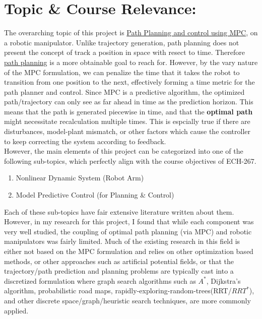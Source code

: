 \documentclass[12px]{article}
\begin{document}
    \pagebreak

    \section*{Topic \& Course Relevance:}


    The overarching topic of this project is \underline{Path Planning and control using MPC}, on a robotic manipulator. Unlike trajectory generation, path planning does not present the concept of track a position in space with resect to time. Therefore \underline{path planning} is a more obtainable goal to reach for. However, by the vary nature of the MPC formulation, we can penalize the time that it takes the robot to transition from one position to the next, effectively forming a time metric for the path planner and control. Since MPC is a predictive algorithm, the optimized path/trajectory can only see as far ahead in time as the prediction horizon. This means that the path is generated piecewise in time, and that the \textbf{optimal path} might necessitate recalculation multiple times. This is espcially true if there are disturbances, model-plant mismatch, or other factors which cause the controller to keep correcting the system according to feedback. \\

    \noindent However, the main elements of this project can be categorized into one of the following sub-topics, which perfectly align with the course objectives of ECH-267.

    \begin{enumerate}
        \item Nonlinear Dynamic System (Robot Arm)
        \item Model Predictive Control (for Planning \& Control)
    \end{enumerate}

    \noindent Each of these sub-topics have fair extensive literature written about them. However, in my research for this project, I found that while each component was very well studied, the coupling of optimal path planning (via MPC) and robotic manipulators was fairly limited. \cite{chao} Much of the existing research in this field is either not based on the MPC formulation and relies on other optimization based methods, or other approaches such as artificial potential fields, or that the trajectory/path prediction and planning problems are typically cast into a discretized formulation where graph search algorithms such as $A^*$, Dijkstra's algorithm, probabilistic road maps, rapidly-exploring-random-trees(RRT/$RRT^*$), and other discrete space/graph/heuristic search techniques, are more commonly applied. \\
\end{document}

